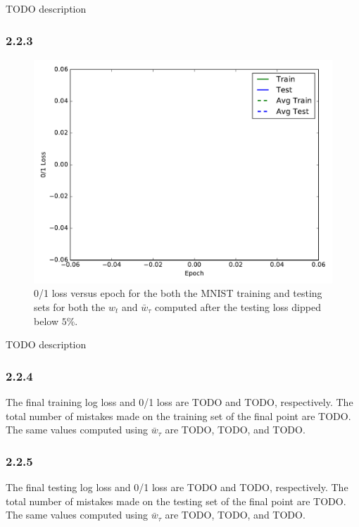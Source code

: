 \documentclass[12pt]{amsart}
\begin{document}
TODO description

\subsubsection*{2.2.3}

\begin{figure}[H]
	\includegraphics[width=\columnwidth]{logistic_01_loss_masked.pdf}
    \caption{0/1 loss versus epoch for the both the MNIST training and testing sets for both the $w_t$ and $\bar{w}_{\tau}$ computed after the testing loss dipped below $5\%$.}
    \label{fig:logistic_01_loss_masked}
\end{figure}

TODO description

\subsubsection*{2.2.4}

The final training log loss and 0/1 loss are TODO and TODO, respectively.  The total number of mistakes made on the training set of the final point are TODO.  The same values computed using $\bar{w}_{\tau}$ are TODO, TODO, and TODO.

\subsubsection*{2.2.5}

The final testing log loss and 0/1 loss are TODO and TODO, respectively.  The total number of mistakes made on the testing set of the final point are TODO.  The same values computed using $\bar{w}_{\tau}$ are TODO, TODO, and TODO.
\end{document}
